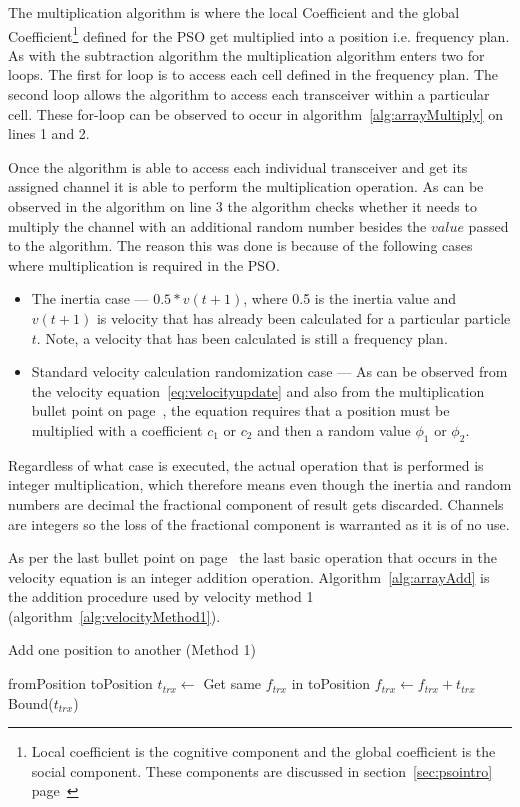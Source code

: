 The multiplication algorithm is where the local Coefficient and the global Coefficient\footnote{Local coefficient is the cognitive component and the global coefficient is the social component. These components are discussed in section~\ref{sec:psointro} page~\pageref{def:socialcomponent}} defined for the PSO get multiplied into a position i.e. frequency plan. As with the subtraction algorithm the multiplication algorithm enters two for loops. The first for loop is to access each cell defined in the frequency plan. The second loop allows the algorithm to access each transceiver within a particular cell. These for-loop can be observed to occur in algorithm~\ref{alg:arrayMultiply} on lines 1 and 2.

Once the algorithm is able to access each individual transceiver and get its assigned channel it is able to perform the multiplication operation. As can be observed in the algorithm on line 3 the algorithm checks whether it needs to multiply the channel with an additional random number besides the $value$ passed to the algorithm. The reason this was done is because of the following cases where multiplication is required in the PSO.

\begin{itemize}
\item The inertia case --- $0.5 * v(t+1)$, where 0.5 is the inertia value and $v(t+1)$ is velocity that has already been calculated for a particular particle $t$. Note, a velocity that has been calculated is still a frequency plan.
\item Standard velocity calculation randomization case --- As can be observed from the velocity equation~\ref{eq:velocityupdate} and also from the multiplication bullet point on page~\pageref{lst:velocitybreakup}, the equation requires that a position must be multiplied with a coefficient $c_1$ or $c_2$ and then a random value $\phi_1$ or $\phi_2$. 
\end{itemize}

Regardless of what case is executed, the actual operation that is performed is integer multiplication, which therefore means even though the inertia and random numbers are decimal the fractional component of result gets discarded. Channels are integers so the loss of the fractional component is warranted as it is of no use.

As per the last bullet point on page~\pageref{lst:velocitybreakup} the last basic operation that occurs in the velocity equation is an integer addition operation. Algorithm~\ref{alg:arrayAdd} is the addition procedure used by velocity method 1 (algorithm~\ref{alg:velocityMethod1}).
\begin{algorithm}
\caption{Add one position to another (Method 1)}
\label{alg:arrayAdd}
\begin{algorithmic}[1]
	\REQUIRE fromPosition
	\REQUIRE toPosition
			\STATE $t_{trx} \leftarrow$ Get same $f_{trx}$ in toPosition
			\STATE $f_{trx} \leftarrow f_{trx} + t_{trx}$
			\STATE Bound($t_{trx}$)
		\ENDFOR
	\ENDFOR
\end{algorithmic}
\end{algorithm}

